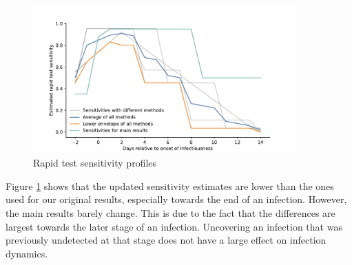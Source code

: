 {    %
    \begin{figure}
        \centering
        \includegraphics[width=0.9\textwidth]{figures/results/figures/data/testing/sensitivity_params_with_different_methods}
        \caption{Rapid test sensitivity profiles}
        \label{fig:sensitivity_assumptions}
    \end{figure}

    \FloatBarrier

    Figure \ref{fig:sensitivity_assumptions} shows that the updated sensitivity
    estimates are lower than the ones used for our original results, especially towards
    the end of an infection. However, the main results barely change. This is due to the
    fact that the differences are largest towards the later stage of an
    infection. Uncovering an infection that was previously undetected at that stage does
    not have a large effect on infection dynamics.

    \begin{figure}
        \centering


\end{figure}}
